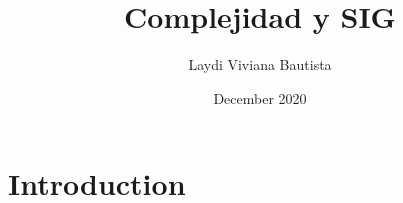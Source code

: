 \documentclass{article}
\title{Complejidad y SIG}
\author{Laydi Viviana Bautista}
\date{December 2020}
\begin{document}
\maketitle

\section{Introduction}
\end{document}
